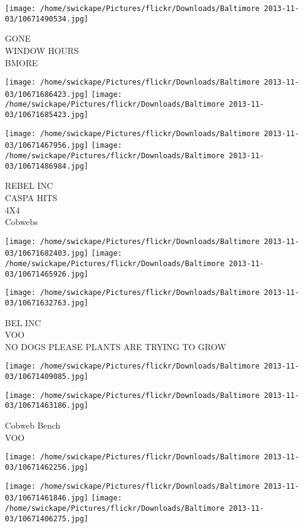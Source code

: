 \documentclass[10pt,letterpaper]{article}
\begin{document}
\vspace{0.25in}
\texttt{[image: /home/swickape/Pictures/flickr/Downloads/Baltimore 2013-11-03/10671490534.jpg]}

GONE\\
WINDOW HOURS\\
BMORE\\
\pagebreak

\texttt{[image: /home/swickape/Pictures/flickr/Downloads/Baltimore 2013-11-03/10671686423.jpg]}
\texttt{[image: /home/swickape/Pictures/flickr/Downloads/Baltimore 2013-11-03/10671685423.jpg]}

\texttt{[image: /home/swickape/Pictures/flickr/Downloads/Baltimore 2013-11-03/10671467956.jpg]}
\texttt{[image: /home/swickape/Pictures/flickr/Downloads/Baltimore 2013-11-03/10671486984.jpg]}

REBEL INC\\
CASPA HITS\\
4X4\\
Cobwebs\\
\pagebreak

\texttt{[image: /home/swickape/Pictures/flickr/Downloads/Baltimore 2013-11-03/10671682403.jpg]}
\texttt{[image: /home/swickape/Pictures/flickr/Downloads/Baltimore 2013-11-03/10671465926.jpg]}

\texttt{[image: /home/swickape/Pictures/flickr/Downloads/Baltimore 2013-11-03/10671632763.jpg]}

BEL INC\\
VOO\\
NO DOGS PLEASE PLANTS ARE TRYING TO GROW\\
\pagebreak

\texttt{[image: /home/swickape/Pictures/flickr/Downloads/Baltimore 2013-11-03/10671409085.jpg]}

\vspace{0.25in}
\texttt{[image: /home/swickape/Pictures/flickr/Downloads/Baltimore 2013-11-03/10671463186.jpg]}

Cobweb Bench\\
VOO\\
\pagebreak

\texttt{[image: /home/swickape/Pictures/flickr/Downloads/Baltimore 2013-11-03/10671462256.jpg]}

\vspace{0.25in}
\texttt{[image: /home/swickape/Pictures/flickr/Downloads/Baltimore 2013-11-03/10671461846.jpg]}
\texttt{[image: /home/swickape/Pictures/flickr/Downloads/Baltimore 2013-11-03/10671406275.jpg]}
\end{document}
